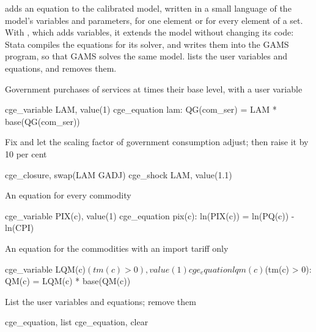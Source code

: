 

 adds an equation to the calibrated model, written in a small
language of the model's variables and parameters, for one element or for every
element of a set. With , which adds variables, it extends
the model without changing its code: Stata compiles the equations for its
solver, and  writes them into the GAMS program, so that GAMS
solves the same model.  lists the user variables and
equations, and  removes them.


Government purchases of services at  times their base level, with
 a user variable
\begin{stcode}
cge_variable LAM, value(1)
cge_equation lam: QG(com_ser) = LAM * base(QG(com_ser))
\end{stcode}
Fix  and let the scaling factor of government consumption adjust; then
raise it by 10 per cent
\begin{stcode}
cge_closure, swap(LAM GADJ)
cge_shock LAM, value(1.1)
\end{stcode}
An equation for every commodity
\begin{stcode}
cge_variable PIX(c), value(1)
cge_equation pix(c): ln(PIX(c)) = ln(PQ(c)) - ln(CPI)
\end{stcode}
An equation for the commodities with an import tariff only
\begin{stcode}
cge_variable LQM(c)$(tm(c) > 0), value(1)
cge_equation lqm(c)$(tm(c) > 0): QM(c) = LQM(c) * base(QM(c))
\end{stcode}
List the user variables and equations; remove them
\begin{stcode}
cge_equation, list
cge_equation, clear
\end{stcode}



